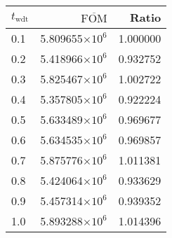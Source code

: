 \begin{tabular}{lrr}
\toprule
$t_{\mathrm{wdt}}$ & $\overline{\mathrm{FOM}}$ &    Ratio \\
\midrule
               0.1 &   5.809655$\times 10^{6}$ & 1.000000 \\
               0.2 &   5.418966$\times 10^{6}$ & 0.932752 \\
               0.3 &   5.825467$\times 10^{6}$ & 1.002722 \\
               0.4 &   5.357805$\times 10^{6}$ & 0.922224 \\
               0.5 &   5.633489$\times 10^{6}$ & 0.969677 \\
               0.6 &   5.634535$\times 10^{6}$ & 0.969857 \\
               0.7 &   5.875776$\times 10^{6}$ & 1.011381 \\
               0.8 &   5.424064$\times 10^{6}$ & 0.933629 \\
               0.9 &   5.457314$\times 10^{6}$ & 0.939352 \\
               1.0 &   5.893288$\times 10^{6}$ & 1.014396 \\
\bottomrule
\end{tabular}
